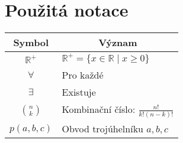 \chapter*{Použitá notace}
\label{sec:notace}
\noindent
\begin{table}[h]
\begin{tabular}{c l}
    Symbol & \multicolumn{1}{c}{Význam} \\
    \toprule
    $\mathbb{R}^+$ & $\mathbb{R}^+=\{ x \in \mathbb{R} \mid x \geq 0 \}$ \\
    $ \forall$ & Pro každé \\
    $ \exists$ & Existuje \\
    $ \binom{n}{k}$ & Kombinační číslo: $\frac{n!}{k!(n-k)!}$ \\
    $ p(a, b, c)$ & Obvod trojúhelníku $a, b, c$ \\
\end{tabular}
\end{table}